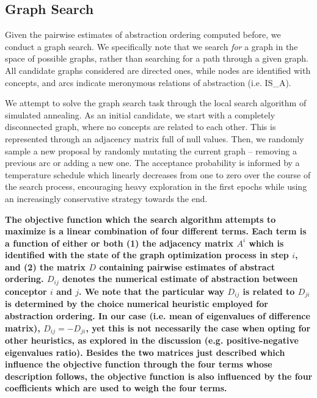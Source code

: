 \subsection{Graph Search}

Given the pairwise estimates of abstraction ordering computed before, we conduct a graph search. We specifically note that we search \textit{for} a graph in the space of possible graphs, rather than searching for a path through a given graph. All candidate graphs considered are directed ones, while nodes are identified with concepts, and arcs indicate meronymous relations of abstraction (i.e. IS\_A).

We attempt to solve the graph search task through the local search algorithm of simulated annealing. As an initial candidate, we start with a completely disconnected graph, where no concepts are related to each other. This is represented through an adjacency matrix full of null values. Then, we randomly sample a new proposal by randomly mutating the current graph -- removing a previous arc or adding a new one. The acceptance probability is informed by a temperature schedule which linearly decreases from one to zero over the course of the search process, encouraging heavy exploration in the first epochs while using an increasingly conservative strategy towards the end.

\textbf{The objective function which the search algorithm attempts to maximize is a linear combination of four different terms. Each term is a function of either or both (1) the adjacency matrix $A^i$ which is identified with the state of the graph optimization process in step $i$, and (2) the matrix $D$ containing pairwise estimates of abstract ordering. $D_{ij}$ denotes the numerical estimate of abstraction between conceptor $i$ and $j$. We note that the particular way $D_{ij}$ is related to $D_{ji}$ is determined by the choice numerical heuristic employed for abstraction ordering. In our case (i.e. mean of eigenvalues of difference matrix), $D_{ij} = -D_{ji}$, yet this is not necessarily the case when opting for other heuristics, as explored in the discussion (e.g. positive-negative eigenvalues ratio). Besides the two matrices just described which influence the objective function through the four terms whose description follows, the objective function is also influenced by the four coefficients which are used to weigh the four terms.}

